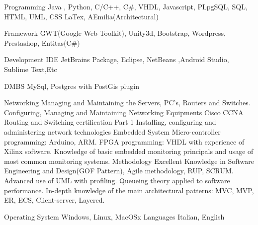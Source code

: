 


\begin{cvskills}


\cvskill
{Programming} %
{Java , Python, C/C++, C\#, VHDL, Javascript, PLpgSQL, SQL, HTML, UML, CSS LaTex, AEmilia(Architectural)  } %

\hline

\cvskill
{Framework} %
{GWT(Google Web Toolkit), Unity3d, Bootstrap, Wordpress, Prestashop, Entitas(C\#) } %

\hline

\cvskill
{Development IDE} %
{JetBrains Package, Eclipse, NetBeans ,Android Studio, Sublime Text,Etc} %

\hline


\cvskill
{DMBS} %
{MySql, Postgres with PostGis plugin} %

\hline

\cvskill
{Networking} %
{Managing and Maintaining the Servers, PC's, Routers and Switches.
	Configuring, Managing and Maintaining \newline Networking Equipments
	Cisco CCNA Routing and Switching certification Part 1
	Installing, configuring and \newline administering network technologies 
} %
\hline
\cvskill
{Embedded System} %
{Micro-controller programming: Arduino, ARM. 
 FPGA programming: VHDL with experience of Xilinx software. \newline
 Knowledge of basic embedded monitoring principals and usage of most common monitoring systems. 
} %
\hline
\cvskill
{Methodology} %
{Excellent Knowledge in Software Engineering and Design(GOF Pattern), Agile methodology, RUP, SCRUM. 
\newline Advanced use of UML with profiling. Queueing theory applied to software performance. 
\newline In-depth knowledge of the main architectural patterns: MVC, MVP, ER, ECS, Client-server, Layered.
} %

\hline

\cvskill
{Operating System} %
{Windows, Linux, MacOSx} %
\hline
\cvskill
{Languages} %
{Italian, English} %


\end{cvskills}